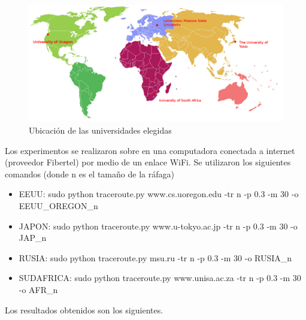  
\begin{figure}[H]
  \centering
  \includegraphics[scale = 0.3]{imagenes/mapa.png}
  \caption{Ubicación de las universidades elegidas}
  \label{histogramaprobabilidadesModel1}
\end{figure}


Los experimentos se realizaron sobre en una computadora conectada a internet (proveedor Fibertel) por medio de un enlace WiFi. Se utilizaron los siguientes comandos (donde n es el tamaño de la ráfaga) 
\begin{itemize}
  \item EEUU:      sudo python traceroute.py www.cs.uoregon.edu -tr n -p 0.3 -m 30 -o EEUU\_OREGON\_n
  \item JAPON:     sudo python traceroute.py www.u-tokyo.ac.jp  -tr n -p 0.3 -m 30 -o JAP\_n
  \item RUSIA:     sudo python traceroute.py msu.ru             -tr n -p 0.3 -m 30 -o RUSIA\_n
  \item SUDAFRICA: sudo python traceroute.py www.unisa.ac.za    -tr n -p 0.3 -m 30 -o AFR\_n 
\end{itemize}

Los resultados obtenidos son los siguientes.


